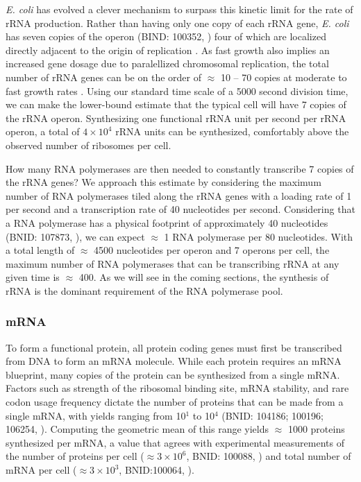 \textit{E. coli} has evolved a clever mechanism to surpass this kinetic limit
for the rate of rRNA production. Rather than having only one copy of each rRNA
gene, \textit{E. coli} has seven copies of the operon (BIND: 100352,
\cite{milo2010}) four of which are localized directly adjacent to the origin of
replication \citep{birnbaum1971}. As fast growth also implies an increased gene
dosage due to paralellized chromosomal replication, the total number of rRNA
genes can be on the order of $\approx$ 10 -- 70 copies at moderate to fast
growth rates \citep{stevenson2004}. Using our standard time scale of a 5000
second division time, we can make the lower-bound estimate that the typical cell
will have 7 copies of the rRNA operon. Synthesizing one functional rRNA unit per
second per rRNA operon, a total of $4 \times 10^4$ rRNA units can be
synthesized, comfortably above the observed number of ribosomes per cell.

How many RNA polymerases are then needed to constantly transcribe 7 copies of
the rRNA genes? We approach this estimate by considering the maximum number
of RNA polymerases tiled along the rRNA genes with a loading rate of 1 per
second and a transcription rate of 40 nucleotides per second. Considering
that a RNA polymerase has a physical footprint of approximately 40
nucleotides (BNID: 107873, \cite{milo2010}), we can expect
$\approx$ 1 RNA polymerase per 80 nucleotides. With a total length of
$\approx$ 4500 nucleotides per operon and 7 operons per cell, the maximum
number of RNA polymerases that can be transcribing rRNA at any given time is
$\approx$ 400. As we will see in the coming sections, the
synthesis of rRNA is the dominant requirement of the RNA polymerase pool.

\subsubsection{mRNA}
To form a functional protein, all protein coding genes must first be
transcribed from DNA to form an mRNA molecule. While each protein requires an
mRNA blueprint, many copies of the protein can be synthesized from a single
mRNA. Factors such as strength of the ribosomal binding site, mRNA stability,
and rare codon usage frequency dictate the number of proteins that can be
made from a single mRNA, with yields ranging from 10$^1$ to 10$^4$ (BNID: 104186; 100196;
106254, \cite{milo2010}). Computing the geometric mean of this range yields
$\approx$ 1000 proteins synthesized per mRNA, a value that agrees with
experimental measurements of the number of proteins per cell ($\approx 3
\times 10^6$, BNID: 100088, \cite{milo2010}) and total number of mRNA per
cell ($\approx 3 \times 10^3$, BNID:100064, \cite{milo2010}).

